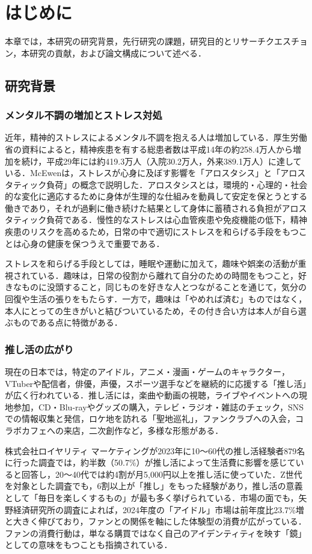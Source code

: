 \chapter{はじめに}
本章では，本研究の研究背景，先行研究の課題，研究目的とリサーチクエスチョン，本研究の貢献，および論文構成について述べる．

\section{研究背景}
\subsection{メンタル不調の増加とストレス対処}
近年，精神的ストレスによるメンタル不調を抱える人は増加している．厚生労働省の資料によると，精神疾患を有する総患者数は平成14年の約258.4万人から増加を続け，平成29年には約419.3万人（入院30.2万人，外来389.1万人）に達している\cite{mhlw2022}．McEwen\cite{mcewen1998}は，ストレスが心身に及ぼす影響を「アロスタシス」と「アロスタティック負荷」の概念で説明した．アロスタシスとは，環境的・心理的・社会的な変化に適応するために身体が生理的な仕組みを動員して安定を保とうとする働きであり，それが過剰に働き続けた結果として身体に蓄積される負担がアロスタティック負荷である．慢性的なストレスは心血管疾患や免疫機能の低下，精神疾患のリスクを高めるため，日常の中で適切にストレスを和らげる手段をもつことは心身の健康を保つうえで重要である．

ストレスを和らげる手段としては，睡眠や運動に加えて，趣味や娯楽の活動が重視されている．趣味は，日常の役割から離れて自分のための時間をもつこと，好きなものに没頭すること，同じものを好きな人とつながることを通じて，気分の回復や生活の張りをもたらす．一方で，趣味は「やめれば済む」ものではなく，本人にとっての生きがいと結びついているため，その付き合い方は本人が自ら選ぶものである点に特徴がある．

\subsection{推し活の広がり}
現在の日本では，特定のアイドル，アニメ・漫画・ゲームのキャラクター，VTuberや配信者，俳優，声優，スポーツ選手などを継続的に応援する「推し活」が広く行われている．推し活には，楽曲や動画の視聴，ライブやイベントへの現地参加，CD・Blu-rayやグッズの購入，テレビ・ラジオ・雑誌のチェック，SNSでの情報収集と発信，ロケ地を訪れる「聖地巡礼」，ファンクラブへの入会，コラボカフェへの来店，二次創作など，多様な形態がある．

株式会社ロイヤリティ マーケティングが2023年に10〜60代の推し活経験者879名に行った調査では，約半数（50.7\%）が推し活によって生活費に影響を感じていると回答し，20〜40代では約4割が月5,000円以上を推し活に使っていた\cite{loyalty2023}．Z世代を対象とした調査でも，6割以上が「推し」をもった経験があり，推し活の意義として「毎日を楽しくするもの」が最も多く挙げられている\cite{mery2023}．市場の面でも，矢野経済研究所の調査によれば，2024年度の「アイドル」市場は前年度比23.7\%増と大きく伸びており，ファンとの関係を軸にした体験型の消費が広がっている\cite{yano2026}．ファンの消費行動は，単なる購買ではなく自己のアイデンティティを映す「鏡」としての意味をもつことも指摘されている\cite{sandvoss2005}．

